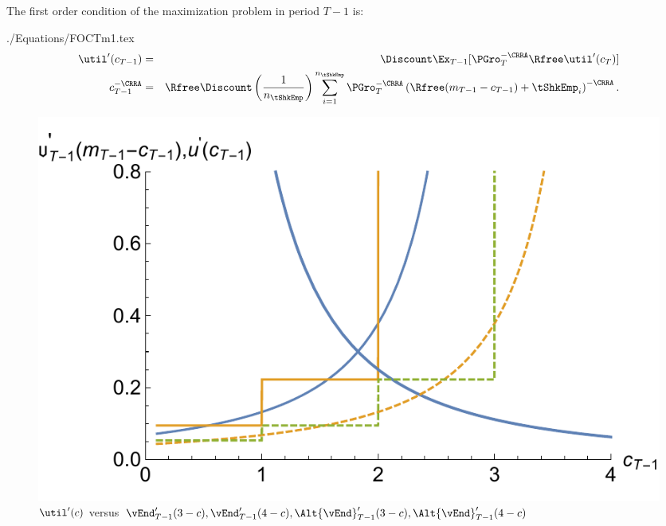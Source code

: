 \documentclass[titlepage]{\econtex}
\begin{document}
The first order condition of the maximization problem in period $T-1$ is:
\begin{verbatimwrite}{./Equations/FOCTm1.tex}
\begin{eqnarray}
    \util^{\prime}({c}_{T-1})      & = & \Discount \Ex_{T-1} [\PGro_{T}^{-\CRRA}\Rfree \util^{\prime}({c}_{T})]  \label{eq:focraw}
\\      {c}_{T-1}^{-\CRRA}  & = & \Rfree \Discount \left(\frac{1}{n_{\tShkEmp}}\right) \sum_{i=1}^{n_{\tShkEmp}} \PGro_{T}^{-\CRRA}\left(\Rfree ({m}_{T-1}-{c}_{T-1}) + \tShkEmp_{i}\right)^{-\CRRA} \label{eq:FOCTm1}.
\end{eqnarray}
\end{verbatimwrite}

\hypertarget{PlotuPrimeVSOPrime}{}
\begin{figure}
        \includegraphics{./Figures/PlotuPrimeVSOPrime}
        \caption{$\util^{\prime}(c)$ versus $\vEnd_{T-1}^{\prime}(3-c), \vEnd_{T-1}^{\prime}(4-c), \Alt{\vEnd}_{T-1}^{\prime}(3-c), \Alt{\vEnd}_{T-1}^{\prime}(4-c)$}
        \label{fig:PlotuPrimeVSOPrime}
\end{figure}
\end{document}
